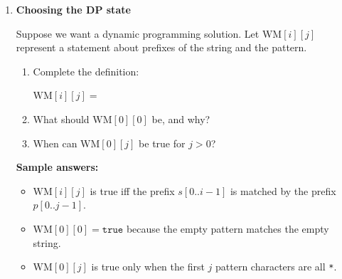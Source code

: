 \documentclass[11pt]{article}
\begin{document}
\begin{enumerate}[leftmargin=0pt, itemindent=1.7em, itemsep=1.2em]
\vspace{0.3cm}
What final answer do you read from the table?

\vspace{1.0cm}

\ifanswers
\textbf{Sample filled table:}
\[
\begin{array}{c|ccccc}
 & \varepsilon & a & * & ? & b \\\hline
\varepsilon & T & F & F & F & F \\
a & F & T & T & F & F \\
d & F & F & T & T & F \\
c & F & F & T & T & F \\
b & F & F & T & T & T
\end{array}
\]
Final answer: Yes.
\fi

\item \textbf{Choosing the DP state}

Suppose we want a dynamic programming solution.
Let $\mathrm{WM}[i][j]$ represent a statement about prefixes of the string and the pattern.

\begin{enumerate}[label=(\alph*), leftmargin=2em, itemsep=0.8em]
\item Complete the definition:

\vspace{0.2cm}
\hspace*{1em}$\mathrm{WM}[i][j] =$ \hrulefill

\vspace{0.6cm}
\item What should $\mathrm{WM}[0][0]$ be, and why?

\vspace{1.0cm}
\item When can $\mathrm{WM}[0][j]$ be true for $j>0$?

\vspace{1.2cm}
\end{enumerate}

\ifanswers
\textbf{Sample answers:}
\begin{itemize}
    \item $\mathrm{WM}[i][j]$ is true iff the prefix $s[0..i-1]$ is matched by the prefix $p[0..j-1]$.
    \item $\mathrm{WM}[0][0]=\texttt{true}$ because the empty pattern matches the empty string.
    \item $\mathrm{WM}[0][j]$ is true only when the first $j$ pattern characters are all \texttt{*}.
\end{itemize}
\fi



\end{enumerate}
\end{document}
